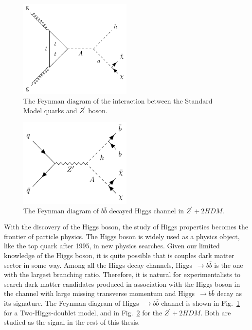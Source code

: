 \begin{figure}[htbp]
    \centering
    \includegraphics[width=0.5\textwidth]{chapters/c2/figures/two-higgs}
    \caption{The Feynman diagram of the interaction between the Standard Model quarks and $Z^{\prime}$ boson.}
    \label{fig:twohiggs}
\end{figure}

\begin{figure}[htbp]
    \centering
    \includegraphics[width=0.5\textwidth]{chapters/c2/figures/z-prime-2hdm}
    \caption{The Feynman diagram of $b\bar{b}$ decayed Higgs channel in $Z^{\prime}+2HDM$.}
    \label{fig:c2zprime2hdm}
\end{figure}


\par With the discovery of the Higgs boson, the study of Higgs properties becomes the frontier of particle physics. The Higgs boson is widely used as a physics object, like the top quark after 1995, in new physics searches. Given our limited knowledge of the Higgs boson, it is quite possible that is couples dark matter sector in some way. Among all the Higgs decay channels, Higgs~$\rightarrow b\bar{b}$ is the one with the largest branching ratio. Therefore, it is natural for experimentalists to search dark matter candidates produced in association with the Higgs boson in the channel with large missing transverse momentum and Higgs~$\rightarrow b\bar{b}$ decay as its signature. The Feynman diagram of Higgs~$\rightarrow b\bar{b}$ channel is shown in Fig.~\ref{fig:twohiggs} for a Two-Higgs-doublet model, and in Fig.~\ref{fig:c2zprime2hdm} for the $Z^{\prime}+2HDM$. Both are studied as the signal in the rest of this thesis.
